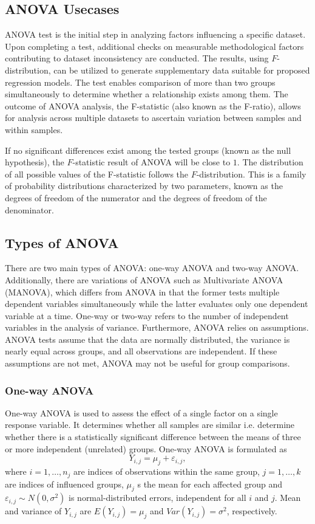 \subsection{ANOVA Usecases}

ANOVA test is the initial step in analyzing factors influencing a specific dataset. Upon completing a test, additional checks on measurable methodological factors contributing to dataset inconsistency are conducted. The results, using $F$-distribution, can be utilized to generate supplementary data suitable for proposed regression models. The test enables comparison of more than two groups simultaneously to determine whether a relationship exists among them. The outcome of ANOVA analysis, the F-statistic (also known as the F-ratio), allows for analysis across multiple datasets to ascertain variation between samples and within samples.

If no significant differences exist among the tested groups (known as the null hypothesis), the $F$-statistic result of ANOVA will be close to $1$. The distribution of all possible values of the F-statistic follows the $F$-distribution. This is a family of probability distributions characterized by two parameters, known as the degrees of freedom of the numerator and the degrees of freedom of the denominator.

\subsection{Types of ANOVA}

There are two main types of ANOVA: one-way ANOVA and two-way ANOVA. Additionally, there are variations of ANOVA such as  Multivariate ANOVA (MANOVA), which differs from ANOVA in that the former tests multiple dependent variables simultaneously while the latter evaluates only one dependent variable at a time. One-way or two-way refers to the number of independent variables in the analysis of variance. Furthermore, ANOVA relies on assumptions. ANOVA tests assume that the data are normally distributed, the variance is nearly equal across groups, and all observations are independent. If these assumptions are not met, ANOVA may not be useful for group comparisons.

\subsubsection{One-way ANOVA}
One-way ANOVA is used to assess the effect of a single factor on a single response variable. It determines whether all samples are similar i.e. determine whether there is a statistically significant difference between the means of three or more independent (unrelated) groups. One-way ANOVA is formulated as
\begin{equation}
 Y_{i,j}=\mu_j + \varepsilon_{i,j},
\end{equation}
where $i=1,\ldots,n_j$ are indices of observations within the same group, $j=1,\ldots,k$ are indices of influenced groups, $\mu_j$ s the mean for each affected group and $\varepsilon_{i,j} \sim N(0,\sigma^2)$ is normal-distributed errors, independent for all $i$ and $j$. Mean and variance of $Y_{i,j}$ are $E(Y_{i,j})=\mu_j$ and $Var(Y_{i,j})=\sigma^2$, respectively.

